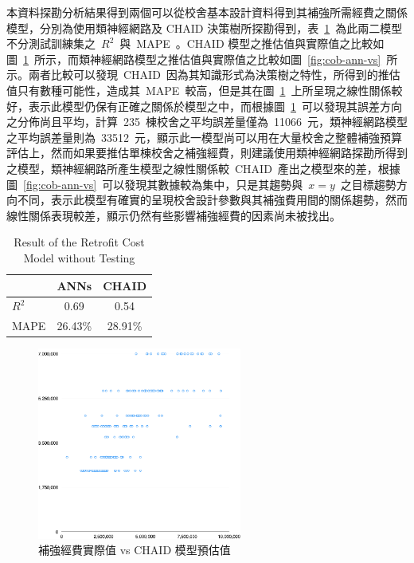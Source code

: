 本資料探勘分析結果得到兩個可以從校舍基本設計資料得到其補強所需經費之關係模型，分別為使用類神經網路及 CHAID 決策樹所探勘得到，表~\ref{tab:cost_result_2}~為此兩二模型不分測試訓練集之~$R^2$~與~MAPE~。CHAID 模型之推估值與實際值之比較如圖~\ref{fig:cob-chaid-vs}~所示，而類神經網路模型之推估值與實際值之比較如圖~\ref{fig:cob-ann-vs}~所示。兩者比較可以發現~CHAID~因為其知識形式為決策樹之特性，所得到的推估值只有數種可能性，造成其~MAPE~較高，但是其在圖~\ref{fig:cob-chaid-vs}~上所呈現之線性關係較好，表示此模型仍保有正確之關係於模型之中，而根據圖~\ref{fig:cob-chaid-vs}~可以發現其誤差方向之分佈尚且平均，計算~235~棟校舍之平均誤差量僅為~11066~元，類神經網路模型之平均誤差量則為~33512~元，顯示此一模型尚可以用在大量校舍之整體補強預算評估上，然而如果要推估單棟校舍之補強經費，則建議使用類神經網路探勘所得到之模型，類神經網路所產生模型之線性關係較~CHAID~產出之模型來的差，根據圖~\ref{fig:cob-ann-vs}~可以發現其數據較為集中，只是其趨勢與~$x = y$~之目標趨勢方向不同，表示此模型有確實的呈現校舍設計參數與其補強費用間的關係趨勢，然而線性關係表現較差，顯示仍然有些影響補強經費的因素尚未被找出。

\begin{table}[hbtp]
  \begin{center}
    \caption{Result of the Retrofit Cost Model without Testing}
    \label{tab:cost_result_2}
    \large
    \begin{tabular}{l c c}
      \hline
       & ANNs & CHAID \\
      \hline
     $R^2$ & 0.69 & 0.54 \\
     MAPE & 26.43\% & 28.91\% \\
      \hline
      \end{tabular}
  \end{center}
\end{table}


\begin{figure}[hbtp]
  \begin{center}
    \includegraphics[width=0.6\textwidth]{figures/cob-chaid-vs.png}
    \caption{補強經費實際值 vs CHAID 模型預估值} 
    \label{fig:cob-chaid-vs}
  \end{center}
\end{figure}


